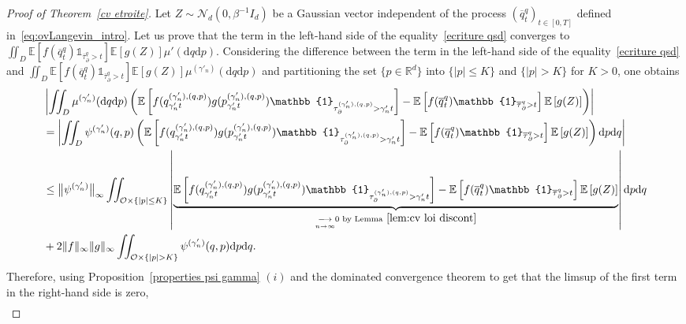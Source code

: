 \documentclass[preprint,EJP]{ejpecp}
\begin{document}
\begin{proof}[Proof of Theorem~\ref{cv etroite}]
Let $Z\sim\mathcal{N}_{d}(0,\beta^{-1} I_d )$ be a Gaussian vector independent of the process $(\overline{q}^q_t)_{t\in[0,T]}$ defined in~\eqref{eq:ovLangevin_intro}. Let us prove that the term in the left-hand side of the equality~\eqref{ecriture qsd} converges to $\iint_{D} \mathbb{E}[f(\overline{q}^q_t) \mathbb{1}_{\overline{\tau}^{q}_\partial>t}] \mathbb{E}[g(Z)]\mu'(\mathrm{d}q\mathrm{d}p)$. Considering the difference between the term in the left-hand side of the equality~\eqref{ecriture qsd} and  $\iint_{D} \mathbb{E}[f(\overline{q}^q_t) \mathbb{1}_{\overline{\tau}^{q}_\partial>t}] \mathbb{E}[g(Z)]\mu^{(\gamma'_n)}(\mathrm{d}q\mathrm{d}p)$ and partitioning the set $\{p\in\mathbb{R}^d\}$ into $\{\vert p\vert\leq K\}$ and $\{\vert p\vert> K\}$ for $K>0$, one obtains
\begin{align*}
    &\left\vert\iint_{D}\mu^{(\gamma'_n)}(\mathrm{d}q\mathrm{d}p) \left(\mathbb{E}\left[f(q^{(\gamma'_n),(q,p)}_{\gamma'_n t}) g(p^{(\gamma'_n),(q,p)}_{\gamma'_n t}) \mathbb{1}_{\tau^{(\gamma'_n),(q,p)}_\partial>\gamma'_n t}\right]-\mathbb{E}\left[f(\overline{q}^q_t) \mathbb{1}_{\overline{\tau}^{q}_\partial>t}\right] \mathbb{E}\left[g(Z)\right]\right)\right\vert\\
    &=\left\vert\iint_{D}\psi^{(\gamma'_n)}(q,p) \left(\mathbb{E}\left[f(q^{(\gamma'_n),(q,p)}_{\gamma'_n t}) g(p^{(\gamma'_n),(q,p)}_{\gamma'_n t}) \mathbb{1}_{\tau^{(\gamma'_n),(q,p)}_\partial>\gamma'_n t}\right]-\mathbb{E}\left[f(\overline{q}^q_t) \mathbb{1}_{\overline{\tau}^{q}_\partial>t}\right] \mathbb{E}\left[g(Z)\right]\right) \mathrm{d}p \mathrm{d}q\right\vert\\
    &\leq\big\Vert\psi^{(\gamma'_n)}\big\Vert_\infty\iint_{\mathcal{O}\times\{\vert p\vert\leq K\}}\left\vert\underbrace{\mathbb{E}\left[f(q^{(\gamma'_n),(q,p)}_{\gamma'_n t}) g(p^{(\gamma'_n),(q,p)}_{\gamma'_n t}) \mathbb{1}_{\tau^{(\gamma'_n),(q,p)}_\partial>\gamma'_n t}\right]-\mathbb{E}\left[f(\overline{q}^q_t) \mathbb{1}_{\overline{\tau}^{q}_\partial>t}\right] \mathbb{E}\left[g(Z)\right]}_{\underset{n\rightarrow\infty}{\longrightarrow}0\text{ by Lemma}~\ref{lem:cv loi discont}}\right\vert \mathrm{d}p \mathrm{d}q\\
    &+2 \Vert f\Vert_\infty \Vert g\Vert_\infty\iint_{\mathcal{O}\times\{\vert p\vert> K\}}\psi^{(\gamma'_n)}(q,p) \mathrm{d}p \mathrm{d}q .
\end{align*}  
Therefore, using Proposition~\ref{properties psi gamma} $(i)$ and the dominated convergence theorem to get that the limsup of the first term in the right-hand side is zero, 
\begin{align*}

\end{align*}
\end{proof}
\end{document}
